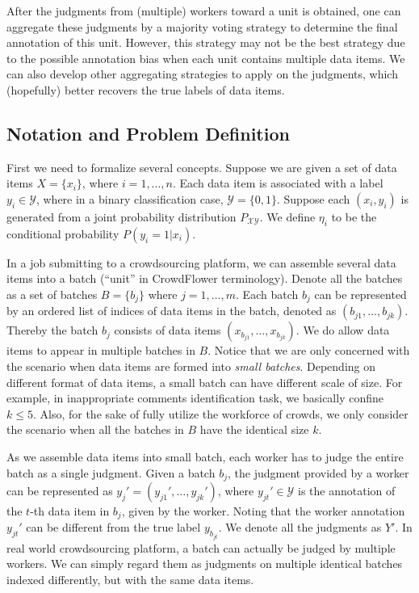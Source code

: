 After the judgments from (multiple) workers toward a unit is obtained, 
one can aggregate these judgments by a majority voting strategy to determine the final annotation of this unit.
However, this strategy may not be the best strategy due to the possible annotation bias when each unit contains multiple data items. 
We can also develop other aggregating strategies to apply on the judgments, 
which (hopefully) better recovers the true labels of data items.  


\subsection{Notation and Problem Definition}

First we need to formalize several concepts.  
Suppose we are given a set of data items $X = \{x_i\}$, where $i=1, \ldots, n$.  
Each data item is associated with a label $y_i \in \mathcal{Y}$,
where in a binary classification case, $\mathcal{Y} = \{0, 1\}$.  
Suppose each $(x_i, y_i)$ is generated from a joint probability distribution $P_{\mathcal{X} \mathcal{Y}}$.  
We define $\eta_i$ to be the conditional probability $P(y_i = 1 | x_i)$.  

In a job submitting to a crowdsourcing platform, 
we can assemble several data items into a batch (``unit'' in CrowdFlower terminology).  
Denote all the batches as a set of batches $B = \{b_j\}$ where $j = 1, \ldots, m$.  
Each batch $b_j$ can be represented by an ordered list of indices of data items in the batch, 
denoted as $(b_{j1}, \ldots, b_{jk})$.  
Thereby the batch $b_j$ consists of data items $(x_{b_{j1}}, \ldots, x_{b_{jk}})$.  
We do allow data items to appear in multiple batches in $B$.  
Notice that we are only concerned with the scenario when data items are formed into \emph{small batches}.  
Depending on different format of data items, a small batch can have different scale of size.  
For example, in inappropriate comments identification task, we basically confine $k \leq 5$.  
Also, for the sake of fully utilize the workforce of crowds, 
we only consider the scenario when all the batches in $B$ have the identical size $k$.  

As we assemble data items into small batch, 
each worker has to judge the entire batch as a single judgment.  
Given a batch $b_j$, the judgment provided by a worker can be represented as $y_j' = (y_{j1}', \ldots, y_{jk}')$, 
where $y_{j t}' \in \mathcal{Y}$ is the annotation of the $t$-th data item in $b_j$, given by the worker.  
Noting that the worker annotation $y_{j t}'$ can be different from the true label $y_{b_{j t}}$.  
We denote all the judgments as $Y'$.  
In real world crowdsourcing platform, a batch can actually be judged by multiple workers.  
We can simply regard them as judgments on multiple identical batches indexed differently, but with the same data items.  



